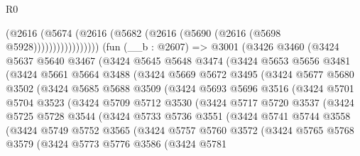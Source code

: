 \begin{lexlean}{R0}
\begin{coremodule}
                      (@2616 (@5674 (@2616 (@5682 (@2616 (@5690 (@2616 (@5698 @5928)))))))))))))))))
    (fun (__b : @2607) =>
    @3001
      (@3426
        @3460
        (@3424
          @5637
          @5640
          @3467
          (@3424
            @5645
            @5648
            @3474
            (@3424
              @5653
              @5656
              @3481
              (@3424
                @5661
                @5664
                @3488
                (@3424
                  @5669
                  @5672
                  @3495
                  (@3424
                    @5677
                    @5680
                    @3502
                    (@3424
                      @5685
                      @5688
                      @3509
                      (@3424
                        @5693
                        @5696
                        @3516
                        (@3424
                          @5701
                          @5704
                          @3523
                          (@3424
                            @5709
                            @5712
                            @3530
                            (@3424
                              @5717
                              @5720
                              @3537
                              (@3424
                                @5725
                                @5728
                                @3544
                                (@3424
                                  @5733
                                  @5736
                                  @3551
                                  (@3424
                                    @5741
                                    @5744
                                    @3558
                                    (@3424
                                      @5749
                                      @5752
                                      @3565
                                      (@3424
                                        @5757
                                        @5760
                                        @3572
                                        (@3424
                                          @5765
                                          @5768
                                          @3579
                                          (@3424
                                            @5773
                                            @5776
                                            @3586
                                            (@3424
                                              @5781

\end{coremodule}
\end{lexlean}
